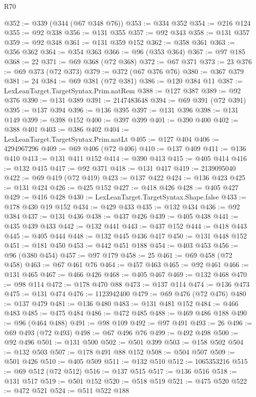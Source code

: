 \begin{lexlean}{R70}
\begin{coremodule}
@352 := @339 (@344 (@67 @348 @76))
@353 := @334 @352
@354 := @216 @124
@355 := @92 @338
@356 := @131 @355
@357 := @92 @343
@358 := @131 @357
@359 := @92 @348
@361 := @131 @359 @152
@362 := @358 @361
@363 := @356 @362
@364 := @354 @363
@366 := @96 (@353 @364)
@367 := @97 @185
@368 := 22
@371 := @69 @368 (@72 @368)
@372 := @67 @371
@373 := 23
@376 := @69 @373 (@72 @373)
@379 := @372 (@67 @376 @76)
@380 := @367 @379
@381 := 24
@384 := @69 @381 (@72 @381)
@386 := @120 @384 @11
@387 := LexLeanTarget.TargetSyntax.Prim.natRem
@388 := @127 @387
@389 := @92 @376
@390 := @131 @389
@391 := 2147483648
@394 := @69 @391 (@72 @391)
@395 := @137 @394
@396 := @136 @395
@397 := @131 @396
@398 := @131 @149
@399 := @398 @152
@400 := @397 @399
@401 := @390 @400
@402 := @388 @401
@403 := @386 @402
@404 := LexLeanTarget.TargetSyntax.Prim.natLt
@405 := @127 @404
@406 := 4294967296
@409 := @69 @406 (@72 @406)
@410 := @137 @409
@411 := @136 @410
@413 := @131 @411 @152
@414 := @390 @413
@415 := @405 @414
@416 := @132 @415
@417 := @92 @371
@418 := @131 @417
@419 := 2139095040
@422 := @69 @419 (@72 @419)
@423 := @137 @422
@424 := @136 @423
@425 := @131 @424
@426 := @425 @152
@427 := @418 @426
@428 := @405 @427
@429 := @416 @428
@430 := LexLeanTarget.TargetSyntax.Shape.false
@433 := @178 @430 @19 @152
@434 := @429 @433
@435 := @132 @434
@436 := @92 @384
@437 := @131 @436
@438 := @437 @426
@439 := @405 @438
@441 := @435 @439 @433
@442 := @132 @441
@443 := @437 @152
@444 := @418 @443
@445 := @405 @444
@448 := @132 @445 @436 @417
@450 := @131 @448 @152
@451 := @181 @450
@453 := @442 @451 @188
@454 := @403 @453
@456 := @96 (@380 @454)
@457 := @97 @179
@458 := 25
@461 := @69 @458 (@72 @458)
@463 := @67 @461 @76
@464 := @457 @463
@465 := @92 @461
@466 := @131 @465
@467 := @466 @426
@468 := @405 @467
@469 := @132 @468
@470 := @98 @114
@472 := @178 @470 @88
@473 := @137 @114
@474 := @136 @473
@475 := @131 @474
@476 := 1123942400
@479 := @69 @476 (@72 @476)
@480 := @137 @479
@481 := @136 @480
@483 := @131 @481 @152
@484 := @466 @483
@485 := @475 @484
@486 := @472 @485
@488 := @469 @486 @188
@490 := @96 (@464 @488)
@491 := @98 @109
@492 := @97 @491
@493 := 26
@496 := @69 @493 (@72 @493)
@498 := @67 @496 @76
@499 := @492 @498
@500 := @92 @496
@501 := @131 @500
@502 := @501 @399
@503 := @158 @502
@504 := @132 @503
@507 := @178 @491 @88 @152
@508 := @504 @507
@509 := @501 @426
@510 := @405 @509
@511 := @132 @510
@512 := 1065353216
@515 := @69 @512 (@72 @512)
@516 := @137 @515
@517 := @136 @516
@518 := @131 @517
@519 := @501 @152
@520 := @518 @519
@521 := @475 @520
@522 := @472 @521
@524 := @511 @522 @188

\end{coremodule}
\end{lexlean}
